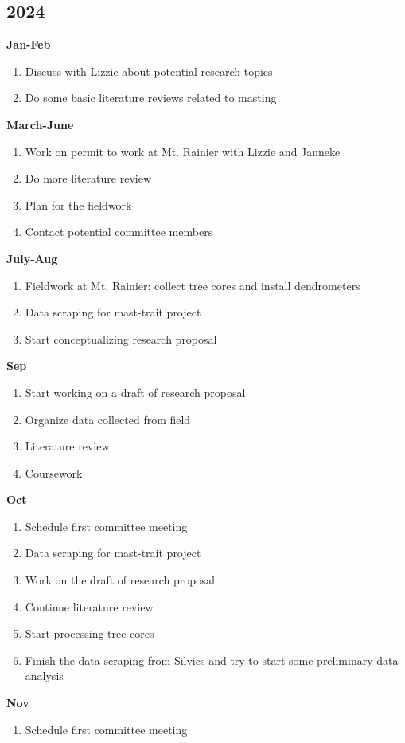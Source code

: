 \documentclass[12pt,letter]{article}
\begin{document}
\begin{multicols}{2}
\subsection{2024}
\textbf{Jan-Feb}
 \begin{enumerate}
	\item Discuss with Lizzie about potential research topics
	\item Do some basic literature reviews related to masting
	\end{enumerate}
\textbf{March-June}
 \begin{enumerate}
	\item Work on permit to work at Mt. Rainier with Lizzie and Janneke
	\item Do more literature review
	\item Plan for the fieldwork
	\item Contact potential committee members
	\end{enumerate}
\textbf{July-Aug}
 \begin{enumerate}
	\item Fieldwork at Mt. Rainier: collect tree cores and install dendrometers
	\item Data scraping for mast-trait project
	\item Start conceptualizing research proposal
	\end{enumerate}
\textbf{Sep}
 \begin{enumerate}
	\item Start working on a draft of research proposal
	\item Organize data collected from field
	\item Literature review
	\item Coursework
	\end{enumerate}
\textbf{Oct}	
\begin{enumerate}
	\item Schedule first committee meeting
	\item Data scraping for mast-trait project
	\item Work on the draft of research proposal
	\item Continue literature review
	\item Start processing tree cores
	\item Finish the data scraping from Silvics and try to start some preliminary data analysis
	\end{enumerate}
\textbf{Nov}	
\begin{enumerate}
	\item Schedule first committee meeting

\end{enumerate}
\end{multicols}
\end{document}
